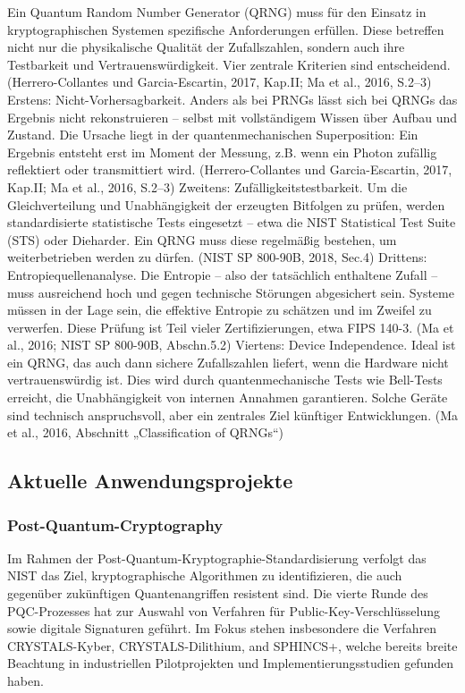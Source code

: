 \noindent
Ein Quantum Random Number Generator (QRNG) muss für den Einsatz in kryptographischen Systemen spezifische Anforderungen erfüllen. Diese betreffen nicht nur die physikalische Qualität der Zufallszahlen, sondern auch ihre Testbarkeit und Vertrauenswürdigkeit. Vier zentrale Kriterien sind entscheidend.
 (Herrero-Collantes und Garcia-Escartin, 2017, Kap.II; Ma et al., 2016, S.2–3)
Erstens: Nicht-Vorhersagbarkeit. Anders als bei PRNGs lässt sich bei QRNGs das Ergebnis nicht rekonstruieren – selbst mit vollständigem Wissen über Aufbau und Zustand. Die Ursache liegt in der quantenmechanischen Superposition: Ein Ergebnis entsteht erst im Moment der Messung, z.B. wenn ein Photon zufällig reflektiert oder transmittiert wird.
 (Herrero-Collantes und Garcia-Escartin, 2017, Kap.II; Ma et al., 2016, S.2–3)
Zweitens: Zufälligkeitstestbarkeit. Um die Gleichverteilung und Unabhängigkeit der erzeugten Bitfolgen zu prüfen, werden standardisierte statistische Tests eingesetzt – etwa die NIST Statistical Test Suite (STS) oder Dieharder. Ein QRNG muss diese regelmäßig bestehen, um weiterbetrieben werden zu dürfen.
 (NIST SP 800-90B, 2018, Sec.4)
Drittens: Entropiequellenanalyse. Die Entropie – also der tatsächlich enthaltene Zufall – muss ausreichend hoch und gegen technische Störungen abgesichert sein. Systeme müssen in der Lage sein, die effektive Entropie zu schätzen und im Zweifel zu verwerfen. Diese Prüfung ist Teil vieler Zertifizierungen, etwa FIPS 140-3.
 (Ma et al., 2016; NIST SP 800-90B, Abschn.5.2)
Viertens: Device Independence. Ideal ist ein QRNG, das auch dann sichere Zufallszahlen liefert, wenn die Hardware nicht vertrauenswürdig ist. Dies wird durch quantenmechanische Tests wie Bell-Tests erreicht, die Unabhängigkeit von internen Annahmen garantieren. Solche Geräte sind technisch anspruchsvoll, aber ein zentrales Ziel künftiger Entwicklungen.
 (Ma et al., 2016, Abschnitt „Classification of QRNGs“)
 

\subsection{Aktuelle Anwendungsprojekte}
\subsubsection{Post-Quantum-Cryptography}
\cite{}
Im Rahmen der Post-Quantum-Kryptographie-Standardisierung verfolgt das NIST das Ziel, kryptographische Algorithmen zu identifizieren, die auch gegenüber zukünftigen Quantenangriffen resistent sind. Die vierte Runde des PQC-Prozesses hat zur Auswahl von Verfahren für Public-Key-Verschlüsselung sowie digitale Signaturen geführt. Im Fokus stehen insbesondere die Verfahren CRYSTALS-Kyber, CRYSTALS-Dilithium, and SPHINCS+, welche bereits breite Beachtung in industriellen Pilotprojekten und Implementierungsstudien gefunden haben.

